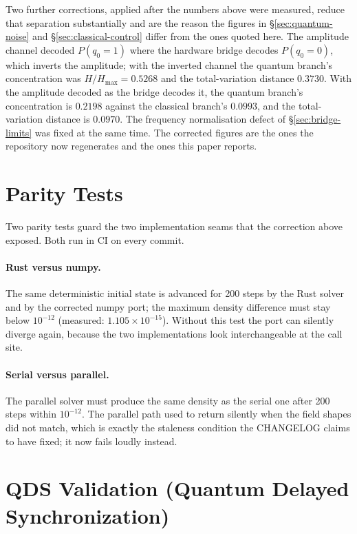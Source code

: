 \documentclass[sigconf,anonymous=false]{acmart}
\begin{document}
Two further corrections, applied after the numbers above were measured, reduce that separation
substantially and are the reason the figures in \S\ref{sec:quantum-noise} and
\S\ref{sec:classical-control} differ from the ones quoted here. The amplitude channel decoded
$P(q_0=1)$ where the hardware bridge decodes $P(q_0=0)$, which inverts the amplitude; with the
inverted channel the quantum branch's concentration was $H/H_{\max}=0.5268$ and the
total-variation distance $0.3730$. With the amplitude decoded as the bridge decodes it, the
quantum branch's concentration is $0.2198$ against the classical branch's $0.0993$, and the
total-variation distance is $0.0970$. The frequency normalisation defect of
\S\ref{sec:bridge-limits} was fixed at the same time. The corrected figures are the ones the
repository now regenerates and the ones this paper reports.

\section{Parity Tests}

\label{sec:parity}

Two parity tests guard the two implementation seams that the correction above exposed. Both run
in CI on every commit.

\paragraph{Rust versus numpy.} The same deterministic initial state is advanced for 200 steps by
the Rust solver and by the corrected numpy port; the maximum density difference must stay below
$10^{-12}$ (measured: $1.105\times 10^{-15}$). Without this test the port can silently diverge
again, because the two implementations look interchangeable at the call site.

\paragraph{Serial versus parallel.} The parallel solver must produce the same density as the
serial one after 200 steps within $10^{-12}$. The parallel path used to return silently when the
field shapes did not match, which is exactly the staleness condition the CHANGELOG claims to have
fixed; it now fails loudly instead.

\section{QDS Validation (Quantum Delayed Synchronization)}
\end{document}
